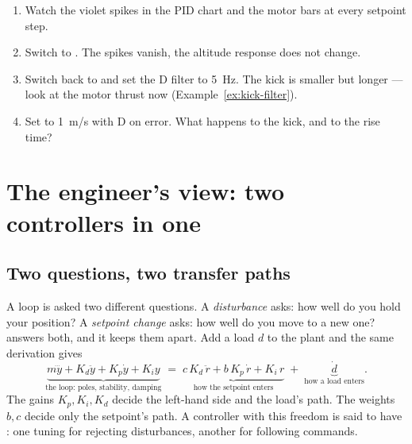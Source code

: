 \begin{trythis}
\begin{enumerate}
  \item Watch the violet spikes in the PID chart and the motor bars at every setpoint step.
  \item Switch  to . The spikes vanish, the altitude response does not change.
  \item Switch back to  and set the D filter to \SI{5}{Hz}. The kick is smaller but longer — look at the motor thrust now (Example~\ref{ex:kick-filter}).
  \item Set  to \SI{1}{m/s} with D on error. What happens to the kick, and to the rise time?
\end{enumerate}
\end{trythis}

\section{The engineer's view: two controllers in one}

\subsection{Two questions, two transfer paths}
A loop is asked two different questions. A \emph{disturbance} asks: how well do you hold your position? A \emph{setpoint change} asks: how well do you move to a new one?  answers both, and it keeps them apart. Add a load $d$ to the plant and the same derivation gives
\begin{equation}\label{eq:kick-2dof}
  \underbrace{m\dddot y + K_d\ddot y + K_p\dot y + K_i y}_{\text{the loop: poles, stability, damping}}
  \;=\; \underbrace{c\,K_d\,\ddot r + b\,K_p\,\dot r + K_i\,r}_{\text{how the setpoint enters}} \;+\; \underbrace{\dot d}_{\text{how a load enters}} .
\end{equation}
The gains $K_p, K_i, K_d$ decide the left-hand side and the load's path. The weights $b, c$ decide only the setpoint's path. A controller with this freedom is said to have : one tuning for rejecting disturbances, another for following commands.

